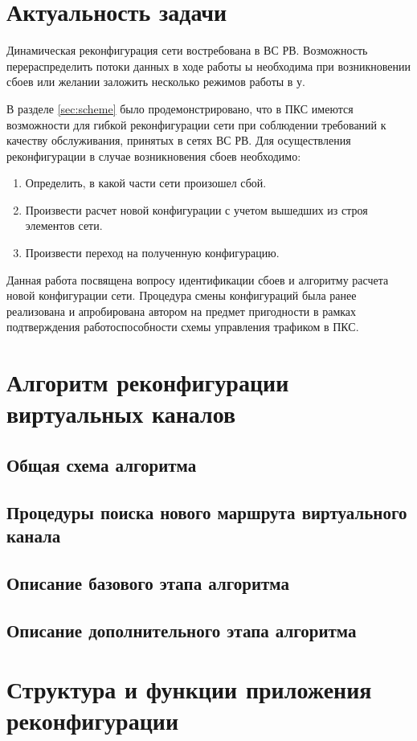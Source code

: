 \documentclass[12pt,fleqn]{article}
\begin{document}
\section{Актуальность задачи}
Динамическая реконфигурация сети востребована в ВС РВ. Возможность перераспределить потоки данных в ходе работы ы необходима при возникновении сбоев или желании заложить несколько режимов работы в у.

В разделе \ref{sec:scheme} было продемонстрировано, что в ПКС имеются возможности для гибкой реконфигурации сети при соблюдении требований к качеству обслуживания, принятых в сетях ВС РВ. Для осуществления реконфигурации в случае возникновения сбоев необходимо:
\begin{enumerate}
	\item Определить, в какой части сети произошел сбой.
	\item Произвести расчет новой конфигурации с учетом вышедших из строя элементов сети.
	\item Произвести переход на полученную конфигурацию.
\end{enumerate}

Данная работа посвящена вопросу идентификации сбоев и алгоритму расчета новой конфигурации сети. Процедура смены конфигураций была ранее реализована и апробирована автором на предмет пригодности в рамках подтверждения работоспособности схемы управления трафиком в ПКС.

\section{Алгоритм реконфигурации виртуальных каналов}
\subsection{Общая схема алгоритма}
\subsection{Процедуры поиска нового маршрута виртуального канала}
\subsection{Описание базового этапа алгоритма}
\subsection{Описание дополнительного этапа алгоритма}


\section{Структура и функции приложения реконфигурации}
\end{document}
